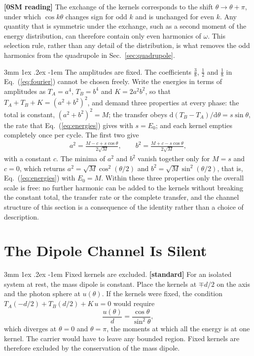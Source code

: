 \documentclass[%
 reprint, amsmath,amssymb, aps, prb, ]{revtex4-2}
\makeatletter
\numberwithin{equation}{section}
\renewcommand\paragraph{%
  \@startsection{paragraph}{4}{\z@}%
    {3mm \@plus 1ex \@minus .2ex}%
    {-1em}%
    {\normalfont\normalsize\itshape}}
\makeatother
\begin{document}
\textbf{[0SM reading]} The exchange of the kernels corresponds to the shift $\theta \to \theta + \pi$, under which $\cos k\theta$ changes sign for odd $k$ and is unchanged for even $k$. Any quantity that is symmetric under the exchange, such as a second moment of the energy distribution, can therefore contain only even harmonics of $\omega$. This selection rule, rather than any detail of the distribution, is what removes the odd harmonics from the quadrupole in Sec.~\ref{sec:quadrupole}.

\paragraph{The amplitudes are fixed.} The coefficients $\tfrac38$, $\tfrac12$ and $\tfrac18$ in Eq.~(\ref{eq:fourier}) cannot be chosen freely. Write the energies in terms of amplitudes as $T_A = a^4$, $T_B = b^4$ and $K = 2a^2b^2$, so that $T_A + T_B + K = (a^2 + b^2)^2$, and demand three properties at every phase: the total is constant, $(a^2 + b^2)^2 = M$; the transfer obeys $\mathrm{d}(T_B - T_A)/\mathrm{d}\theta = s\sin\theta$, the rate that Eq.~(\ref{eq:energies}) gives with $s = E_0$; and each kernel empties completely once per cycle. The first two give
\begin{align}
a^2 = \frac{M - c + s\cos\theta}{2\sqrt{M}}, \qquad b^2 = \frac{M + c - s\cos\theta}{2\sqrt{M}},
\label{eq:rigid}
\end{align}
with a constant $c$. The minima of $a^2$ and $b^2$ vanish together only for $M = s$ and $c = 0$, which returns $a^2 = \sqrt{M}\cos^2(\theta/2)$ and $b^2 = \sqrt{M}\sin^2(\theta/2)$, that is, Eq.~(\ref{eq:energies}) with $E_0 = M$. Within these three properties only the overall scale is free: no further harmonic can be added to the kernels without breaking the constant total, the transfer rate or the complete transfer, and the channel structure of this section is a consequence of the identity rather than a choice of description.

\section{The Dipole Channel Is Silent}
\label{sec:dipole}

\paragraph{Fixed kernels are excluded.} \textbf{[standard]} For an isolated system at rest, the mass dipole is constant. Place the kernels at $\mp d/2$ on the axis and the photon sphere at $u(\theta)$. If the kernels were fixed, the condition $T_A(-d/2) + T_B(d/2) + K\,u = 0$ would require
\begin{equation}
\frac{u(\theta)}{d} = \frac{\cos\theta}{\sin^2\theta},
\label{eq:fixed}
\end{equation}
which diverges at $\theta = 0$ and $\theta = \pi$, the moments at which all the energy is at one kernel. The carrier would have to leave any bounded region. Fixed kernels are therefore excluded by the conservation of the mass dipole.
\end{document}
